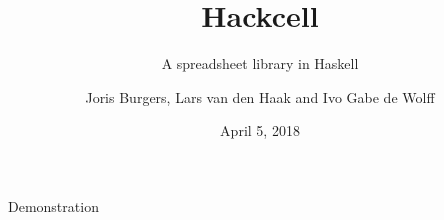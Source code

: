 \documentclass{beamer}
\title{Hackcell}
\subtitle{A spreadsheet library in Haskell}
\author{Joris Burgers, Lars van den Haak and Ivo Gabe de Wolff}
\date{April 5, 2018}
\begin{document}
	\frame{\titlepage}
  \begin{frame}
	\begin{center}
		\huge{Demonstration}
	\end{center}
  \end{frame}
\end{document}
